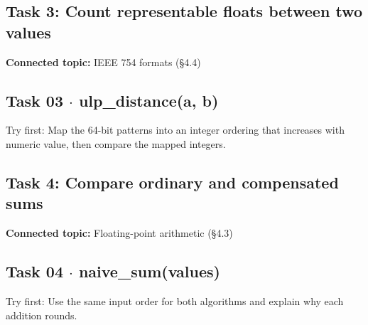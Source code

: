 \documentclass[11pt]{article}
\begin{document}
\begin{keepsection}
\section{Task 3: Count representable floats between two values}

\textbf{Connected topic:} IEEE 754 formats (§4.4)

\begin{keepsection}
\subsection{Task 03 \ensuremath{\cdot} ulp\_distance(a, b)}

Try first: Map the 64-bit patterns into an integer ordering that increases with numeric value, then compare the mapped integers.

\end{keepsection}
\end{keepsection}

\begin{keepsection}
\section{Task 4: Compare ordinary and compensated sums}

\textbf{Connected topic:} Floating-point arithmetic (§4.3)

\begin{keepsection}
\subsection{Task 04 \ensuremath{\cdot} naive\_sum(values)}

Try first: Use the same input order for both algorithms and explain why each addition rounds.

\end{keepsection}
\end{keepsection}
\end{document}
